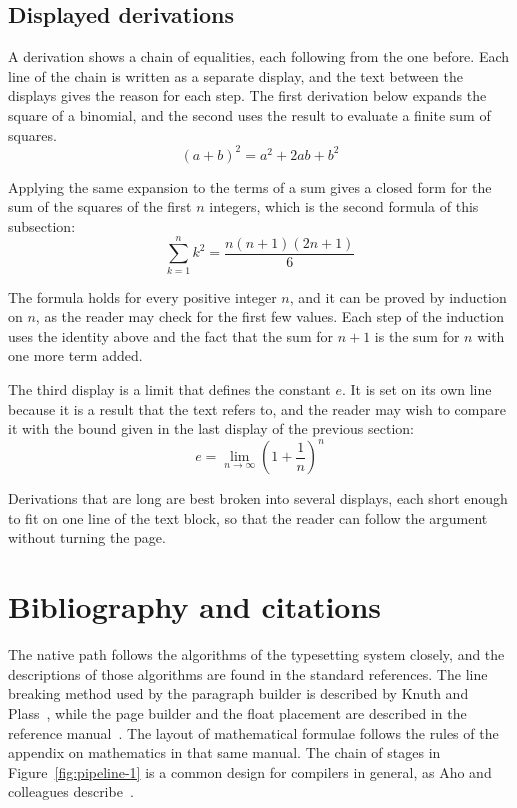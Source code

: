 \documentclass{article}
\begin{document}
\subsection{Displayed derivations}\label{sec:derivations-1}

A derivation shows a chain of equalities, each following from the one before. Each line
of the chain is written as a separate display, and the text between the displays gives
the reason for each step. The first derivation below expands the square of a binomial,
and the second uses the result to evaluate a finite sum of squares.
\[
  (a+b)^{2} = a^{2} + 2ab + b^{2}
\]

Applying the same expansion to the terms of a sum gives a closed form for the sum of the
squares of the first $n$ integers, which is the second formula of this subsection:
\[
  \sum_{k=1}^{n} k^{2} = \frac{n(n+1)(2n+1)}{6}
\]

The formula holds for every positive integer $n$, and it can be proved by induction on
$n$, as the reader may check for the first few values. Each step of the induction
uses the identity above and the fact that the sum for $n+1$ is the sum for $n$ with one
more term added.

The third display is a limit that defines the constant $e$. It is set on its own line
because it is a result that the text refers to, and the reader may wish to compare it
with the bound given in the last display of the previous section:
\[
  e = \lim_{n\to\infty} \left( 1 + \frac{1}{n} \right)^{n}
\]

Derivations that are long are best broken into several displays, each short enough to
fit on one line of the text block, so that the reader can follow the argument without
turning the page.

\section{Bibliography and citations}\label{sec:refs-1}

The native path follows the algorithms of the typesetting system closely, and the
descriptions of those algorithms are found in the standard references. The line
breaking method used by the paragraph builder is described by Knuth and
Plass~\cite{knuth81-1}, while the page builder and the float placement are described in
the reference manual~\cite{knuth86-1}. The layout of mathematical formulae follows the
rules of the appendix on mathematics in that same manual. The chain of stages in
Figure~\ref{fig:pipeline-1} is a common design for compilers in general, as Aho and
colleagues describe~\cite{aho06-1}.
\end{document}
